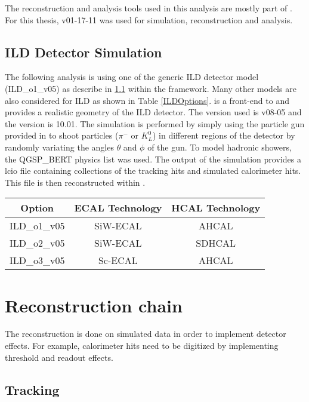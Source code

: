 The reconstruction and analysis tools used in this analysis are mostly part of \ilcsoft. For this thesis, \ilcsoft v01-17-11 was used for simulation, reconstruction and analysis.

\subsection{ILD Detector Simulation}

The following analysis is using one of the generic ILD detector model (ILD\_o1\_v05) as describe in \ref{} within the \mokka framework. Many other models are also considered for ILD as shown in Table \ref{ILDOptions}. \mokka is a front-end to \geant and provides a realistic geometry of the ILD detector. The \mokka version used is v08-05 and the \geant version is 10.01.
The simulation is performed by simply using the particle gun provided in \geant to shoot particles ($\pi^{-}$ or $K^{0}_{L}$) in different regions of the detector by randomly variating the angles $\theta$ and $\phi$ of the gun. To model hadronic showers, the QGSP\_BERT physics list was used. The output of the simulation provides a lcio file containing collections of the tracking hits and simulated calorimeter hits. This file is then reconstructed within \marlin.

\begin{center}
  \begin{tabular}{|c|c|c|}
    \hline
    Option & ECAL Technology & HCAL Technology \\
    \hline
    ILD\_o1\_v05 & SiW-ECAL & AHCAL \\
    ILD\_o2\_v05 & SiW-ECAL & SDHCAL \\
    ILD\_o3\_v05 & Sc-ECAL & AHCAL \\
    \hline
  \end{tabular}
  \medskip
  \label{ILDOptions}
\end{center}

\section{Reconstruction chain}

The reconstruction is done on simulated data in order to implement detector effects. For example, calorimeter hits need to be digitized by implementing threshold and readout effects.

\subsection{Tracking}

